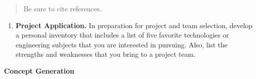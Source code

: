 \documentclass[a4paper,10pt]{book}
\begin{document}
\begin{quote}
Be sure to cite references.
\end{quote}

\begin{enumerate}
\def\labelenumi{\arabic{enumi}.}
\item
  \textbf{Project Application.} In preparation for project and team
  selection, develop a personal inventory that includes a list of five
  favorite technologies or engineering subjects that you are interested
  in pursuing. Also, list the strengths and weaknesses that you bring to
  a project team.
\end{enumerate}

\textbf{Concept Generation}
\end{document}
